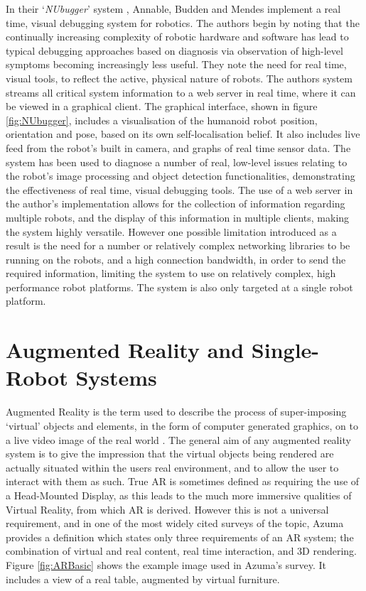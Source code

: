 In their `\textit{NUbugger}' system \cite{Annable:2014}, Annable, Budden and Mendes implement a real time, visual debugging system for robotics. The authors begin by noting that the continually increasing complexity of robotic hardware and software has lead to typical debugging approaches based on diagnosis via observation of high-level symptoms becoming increasingly less useful. They note the need for real time, visual tools, to reflect the active, physical nature of robots. The authors system \cite{Annable:2014} streams all critical system information to a web server in real time, where it can be viewed in a graphical client. The graphical interface, shown in figure \ref{fig:NUbugger}, includes a visualisation of the humanoid robot position, orientation and pose, based on its own self-localisation belief. It also includes live feed from the robot's built in camera, and graphs of real time sensor data. The system has been used to diagnose a number of real, low-level issues \cite{Annable:2014} relating to the robot's image processing and object detection functionalities, demonstrating the effectiveness of real time, visual debugging tools. The use of a web server in the author's implementation \cite{Annable:2014} allows for the collection of information regarding multiple robots, and the display of this information in multiple clients, making the system highly versatile. However one possible limitation introduced as a result is the need for a number or relatively complex networking libraries to be running on the robots, and a high connection bandwidth, in order to send the required information, limiting the system to use on relatively complex, high performance robot platforms. The system is also only targeted at a single robot platform.


\section{Augmented Reality and Single-Robot Systems} \label{AugmentedReality}
Augmented Reality is the term used to describe the process of super-imposing `virtual' objects and elements, in the form of computer generated graphics, on to a live video image of the real world \cite{Azuma:1997}. The general aim of any augmented reality system is to give the impression that the virtual objects being rendered are actually situated within the users real environment, and to allow the user to interact with them as such. True AR is sometimes defined as requiring the use of a Head-Mounted Display, as this leads to the much more immersive qualities of Virtual Reality, from which AR is derived. However this is not a universal requirement, and in one of the most widely cited surveys of the topic, Azuma \cite{Azuma:1997} provides a definition which states only three requirements of an AR system; the combination of virtual and real content, real time interaction, and 3D rendering. Figure \ref{fig:ARBasic} shows the example image used in Azuma's \cite{Azuma:1997} survey. It includes a view of a real table, augmented by virtual furniture.

